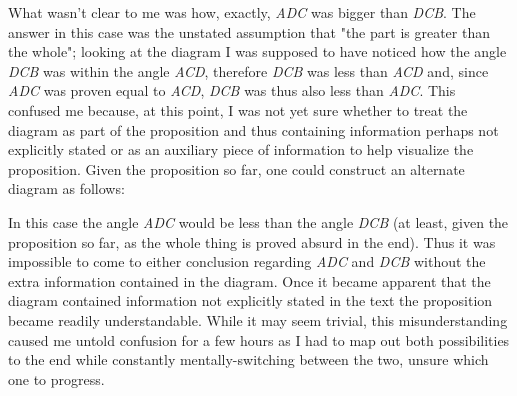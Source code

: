 \documentclass{article}
\begin{document}
What wasn't clear to me was how, exactly, \textit{ADC} was bigger than \textit{DCB}.  The answer in this case was the unstated assumption that "the part is greater than the whole"; looking at the diagram I was supposed to have noticed how the angle \textit{DCB} was within the angle \textit{ACD}, therefore \textit{DCB} was less than \textit{ACD} and, since \textit{ADC} was proven equal to \textit{ACD}, \textit{DCB} was thus also less than \textit{ADC}.  This confused me because, at this point, I was not yet sure whether to treat the diagram as part of the proposition and thus containing information perhaps not explicitly stated or as an auxiliary piece of information to help visualize the proposition.  Given the proposition so far, one could construct an alternate diagram as follows:
\begin{center}
\begin{figure}
\begin{makeimage}
\end{makeimage}
\end{figure}
\end{center}
In this case the angle \textit{ADC} would be less than the angle \textit{DCB} (at least, given the proposition so far, as the whole thing is proved absurd in the end).  Thus it was impossible to come to either conclusion regarding \textit{ADC} and \textit{DCB} without the extra information contained in the diagram.  Once it became apparent that the diagram contained information not explicitly stated in the text the proposition became readily understandable.  While it may seem trivial, this misunderstanding caused me untold confusion for a few hours as I had to map out both possibilities to the end while constantly mentally-switching between the two, unsure which one to progress.
\end{document}

